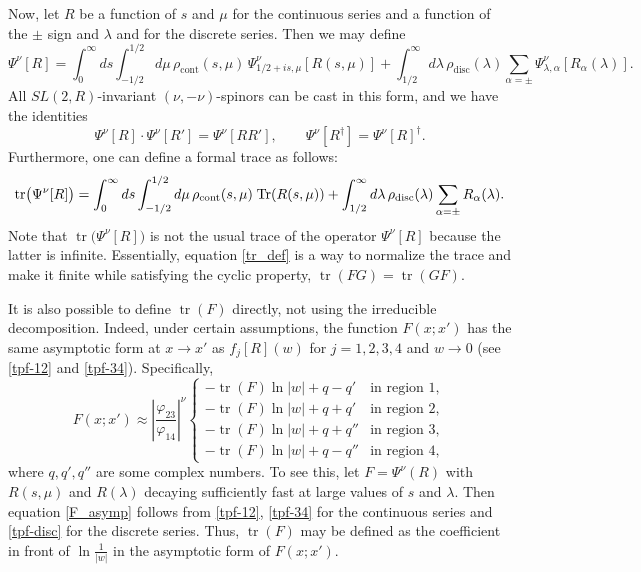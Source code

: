 \documentclass[12pt]{article}
\newcommand{\vp}{\varphi}
\newcommand{\RR}{\mathbb{R}}
\DeclareMathOperator{\tr}{tr}
\DeclareMathOperator{\Tr}{Tr}
\DeclareMathOperator{\SL}{SL}
\newcommand{\rcont}{\rho_{\text{cont}}}
\newcommand{\rdisc}{\rho_{\text{disc}}}
\def\widetilde#1{#1}%
\def\SL{SL}
\def\RR{R}
\begin{document}
Now, let $R$ be a function of $s$ and $\mu$ for the continuous series and a function of the $\pm$ sign and $\lambda$ and for the discrete series. Then we may define
\begin{equation} \label{genop}
\Psi^{\nu}[R]=\int_{0}^{\infty}ds \int_{-1/2}^{1/2}d\mu\,\rcont(s,\mu)\,
\Psi^{\nu}_{1/2+is,\mu}[R(s,\mu)]
+\int_{1/2}^{\infty}d\lambda\,\rdisc(\lambda) \sum_{\alpha=\pm}
\Psi^{\nu}_{\lambda,\alpha}[R_{\alpha}(\lambda)].
\end{equation}
All $\widetilde{\SL}(2,\RR)$-invariant $(\nu,-\nu)$-spinors can be cast in this form, and we have the identities
\begin{equation}
\Psi^{\nu}[R]\cdot\Psi^{\nu}[R']=\Psi^{\nu}[RR'],\qquad
\Psi^{\nu}[R^{\dag}]=\Psi^{\nu}[R]^{\dag}.
\end{equation}
Furthermore, one can define a formal trace as follows:
\begin{equation}\label{tr_def}
\tr\bigl(\Psi^{\nu}[R]\bigr)
=\int_{0}^{\infty}ds \int_{-1/2}^{1/2}d\mu\,\rcont(s,\mu)\kern1pt
\Tr(R(s,\mu))
+\int_{1/2}^{\infty}d\lambda\,\rdisc(\lambda)\sum_{\alpha=\pm}
R_{\alpha}(\lambda).
\end{equation}
Note that $\tr\bigl(\Psi^{\nu}[R]\bigr)$ is not the usual trace of the operator $\Psi^{\nu}[R]$ because the latter is infinite. Essentially, equation \eqref{tr_def} is a way to normalize the trace and make it finite while satisfying the cyclic property, $\tr(FG)=\tr(GF)$.

It is also possible to define $\tr(F)$ directly, not using the irreducible decomposition. Indeed, under certain assumptions, the function $F(x;x')$ has the same asymptotic form at $x\to x'$ as $f_j[R](w)$ for $j=1,2,3,4$ and $w\to 0$ (see \eqref{tpf-12} and \eqref{tpf-34}). Specifically,
\begin{equation}\label{F_asymp}
F(x;x')\approx\left|\frac{\vp_{23}}{\vp_{14}}\right|^{\nu}\begin{cases}
-\tr(F)\ln|w|+q-q' & \text{in region }1,\\
-\tr(F)\ln|w|+q+q' & \text{in region }2,\\
-\tr(F)\ln|w|+q+q'' & \text{in region }3,\\
-\tr(F)\ln|w|+q-q'' & \text{in region }4,
\end{cases}
\end{equation}
where $q,q',q''$ are some complex numbers. To see this, let $F=\Psi^{\nu}(R)$ with $R(s,\mu)$ and $R(\lambda)$ decaying sufficiently fast at large values of $s$ and $\lambda$. Then equation \eqref{F_asymp} follows from \eqref{tpf-12}, \eqref{tpf-34} for the continuous series and \eqref{tpf-disc} for the discrete series. Thus, $\tr(F)$ may be defined as the coefficient in front of $\ln\frac{1}{|w|}$ in the asymptotic form of $F(x;x')$.
\end{document}
